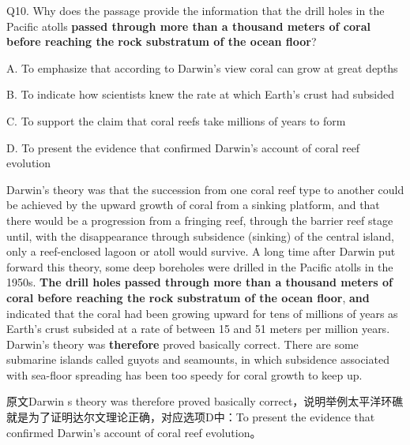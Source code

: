 \begin{blk}
    \begin{qst}
        Q10. Why does the passage provide the information that the drill holes in the Pacific atolls \textbf{passed through more than a thousand meters of coral before reaching the rock substratum of the ocean floor}?
    \end{qst}

    \begin{chc}
        A. To emphasize that according to Darwin’s view coral can grow at great depths

        B. To indicate how scientists knew the rate at which Earth’s crust had subsided

        C. To support the claim that coral reefs take millions of years to form

        D. To present the evidence that confirmed Darwin’s account of coral reef evolution
    \end{chc}

    \begin{psgq}
        Darwin’s theory was that the succession from one coral reef type to another could be achieved by the upward growth of coral from a sinking platform, and that there would be a progression from a fringing reef, through the barrier reef stage until, with the disappearance through subsidence (sinking) of the central island, only a reef-enclosed lagoon or atoll would survive. A long time after Darwin put forward this theory, some deep boreholes were drilled in the Pacific atolls in the 1950s. \textbf{The drill holes passed through more than a thousand meters of coral before reaching the rock substratum of the ocean floor}, \textbf{and} indicated that the coral had been growing upward for tens of millions of years as Earth’s crust subsided at a rate of between 15 and 51 meters per million years. Darwin’s theory was \textbf{therefore} proved basically correct. There are some submarine islands called guyots and seamounts, in which subsidence associated with sea-floor spreading has been too speedy for coral growth to keep up.
    \end{psgq}

    \begin{nlz}
        原文Darwin s theory was therefore proved basically correct，说明举例太平洋环礁就是为了证明达尔文理论正确，对应选项D中：To present the evidence that confirmed Darwin’s account of coral reef evolution。
    \end{nlz}
\end{blk}
